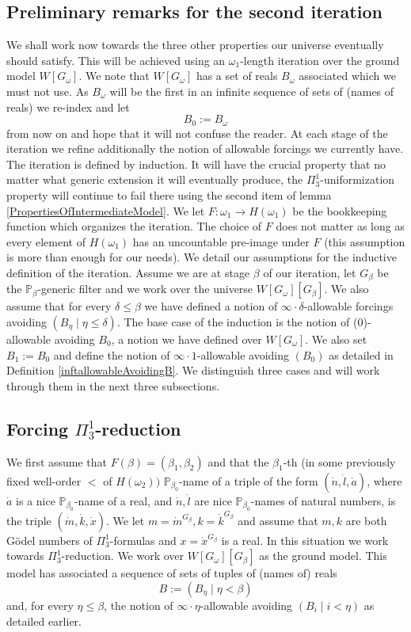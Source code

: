 \documentclass[a4paper,11pt]{article}
\newcommand{\forceP}{\mathbb{P}}
\begin{document}
\subsection{Preliminary remarks for the second iteration}


We shall work now towards the three other properties our universe eventually should satisfy.  This will be achieved using an $\omega_1$-length iteration over the ground model $W[G_{\omega}]$. We note that $W[G_{\omega}]$ has a set of reals $B_{\omega}$ associated which we must not use. As $B_{\omega}$ will be the first in an infinite sequence of sets of (names of reals) we re-index and let \[B_0:= B_{\omega}\] from now on and hope that it will not confuse the reader.  At each stage of the iteration we refine additionally the notion of allowable forcings we currently have. The iteration is defined by induction. It will have the crucial property that no matter what generic extension it will eventually produce, the $\Pi^1_3$-uniformization property will continue to fail there using the second item of lemma \ref{PropertiesOfIntermediateModel}.  We let $F: \omega_1 \rightarrow H(\omega_1)$ be the bookkeeping function which organizes the iteration. The choice of $F$ does not matter as long as every element of $H(\omega_1)$ has an uncountable pre-image under $F$ (this assumption is more than enough for our needs).
We detail our assumptions for the inductive definition of the iteration. Assume  we are at stage $\beta$ of our iteration, let $G_{\beta}$ be the $\forceP_{\beta}$-generic filter and we work over the universe $W[G_{\omega}] [G_{\beta}]$. We also assume that for every $\delta \le \beta$ we  have defined a notion of $\infty \cdot \delta$-allowable forcings avoiding $(B_{\eta} \mid \eta \le \delta) $. The base case of the induction is the notion of (0)-allowable avoiding $B_0$, a notion we have defined over $W[G_{\omega}]$. We also set $B_1:= B_0$ and  define the notion of $\infty \cdot 1 $-allowable avoiding $(B_0)$ as detailed in Definition \ref{inftallowableAvoidingB}.  We distinguish three cases and will work through them in the next three subsections.


    \subsection{Forcing \texorpdfstring{$\Pi^1_3$}{Pi13}-reduction}
    We first assume that $F(\beta)= (\beta_1,\beta_2) $ and that the $\beta_1$-th (in some previously fixed well-order $<$ of $H(\omega_2))$ $\forceP_{\beta_0}$-name of a triple of the form $(\dot{n}, \dot{l}, \dot{a})$, where $\dot{a}$ is a nice $\forceP_{\beta_0}$-name of a real, and $\dot{n}, \dot{l}$ are nice $\forceP_{\beta_0}$-names of natural numbers, is the triple $(\dot{m},\dot{k},\dot{x})$. We let $m = \dot{m}^{G_{\beta}}, k = \dot{k}^{G_{\beta}}$ and assume that $m,k$ are both G\"odel numbers of $\Pi^1_3$-formulas and $x= \dot{x}^{G_{\beta}}$ is a real. ﻿In this situation we work towards $\Pi^1_3$-reduction. We work over $W[G_{\omega}][G_{\beta}]$ as the ground model.
This model has associated a sequence of sets of tuples of (names of) reals
\[ B:= (B_{\eta} \mid  \eta < \beta)  \]
and, for every $\eta \le \beta$, the notion of $\infty \cdot \eta$-allowable avoiding $(B_i \mid i < \eta)$ as detailed earlier. 
\end{document}

